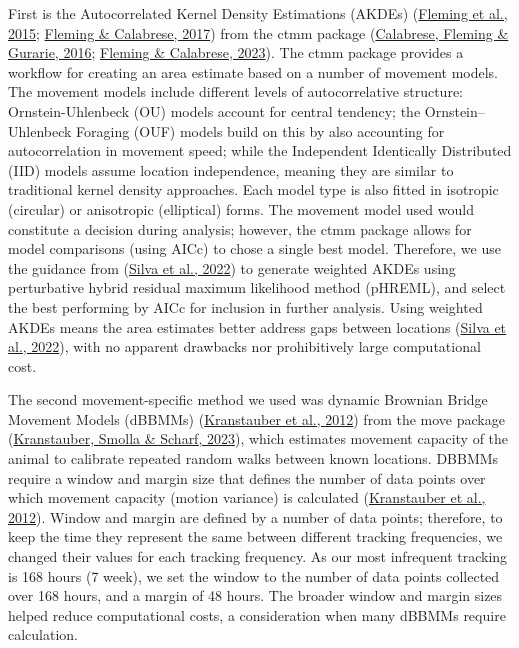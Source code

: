 \documentclass[10pt,a4paper]{article}
\begin{document}
First is the Autocorrelated Kernel Density Estimations (AKDEs) (\protect\hyperlink{ref-Fleming2015}{Fleming et al., 2015}; \protect\hyperlink{ref-Fleming2017}{Fleming \& Calabrese, 2017}) from the ctmm package (\protect\hyperlink{ref-Calabrese2016}{Calabrese, Fleming \& Gurarie, 2016}; \protect\hyperlink{ref-ctmm}{Fleming \& Calabrese, 2023}).
The ctmm package provides a workflow for creating an area estimate based on a number of movement models.
The movement models include different levels of autocorrelative structure: Ornstein-Uhlenbeck (OU) models account for central tendency; the Ornstein--Uhlenbeck Foraging (OUF) models build on this by also accounting for autocorrelation in movement speed; while the Independent Identically Distributed (IID) models assume location independence, meaning they are similar to traditional kernel density approaches.
Each model type is also fitted in isotropic (circular) or anisotropic (elliptical) forms.
The movement model used would constitute a decision during analysis; however, the ctmm package allows for model comparisons (using AICc) to chose a single best model.
Therefore, we use the guidance from (\protect\hyperlink{ref-silva_autocorrelationinformed_2022}{Silva et al., 2022}) to generate weighted AKDEs using perturbative hybrid residual maximum likelihood method (pHREML), and select the best performing by AICc for inclusion in further analysis.
Using weighted AKDEs means the area estimates better address gaps between locations (\protect\hyperlink{ref-silva_autocorrelationinformed_2022}{Silva et al., 2022}), with no apparent drawbacks nor prohibitively large computational cost.

The second movement-specific method we used was dynamic Brownian Bridge Movement Models (dBBMMs) (\protect\hyperlink{ref-Kranstauber2012}{Kranstauber et al., 2012}) from the move package (\protect\hyperlink{ref-move}{Kranstauber, Smolla \& Scharf, 2023}), which estimates movement capacity of the animal to calibrate repeated random walks between known locations.
DBBMMs require a window and margin size that defines the number of data points over which movement capacity (motion variance) is calculated (\protect\hyperlink{ref-Kranstauber2012}{Kranstauber et al., 2012}).
Window and margin are defined by a number of data points; therefore, to keep the time they represent the same between different tracking frequencies, we changed their values for each tracking frequency.
As our most infrequent tracking is 168 hours (7 week), we set the window to the number of data points collected over 168 hours, and a margin of 48 hours.
The broader window and margin sizes helped reduce computational costs, a consideration when many dBBMMs require calculation.
\end{document}
